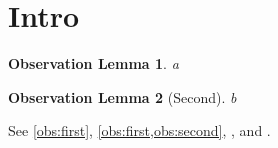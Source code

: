\documentclass[twocolumn,unicode]{wrapper}
\begin{document}
\wrapperclass\articleclass\layoutmode\hypermode
\newtheorem{oblemma}{Observation Lemma}
\section{Intro}
\begin{oblemma}\label{obs:first}
a
\end{oblemma}
\begin{oblemma}[Second]\label{obs:second}
b
\end{oblemma}
See \autoref{obs:first}, \cref{obs:first,obs:second}, , and .
\end{document}
